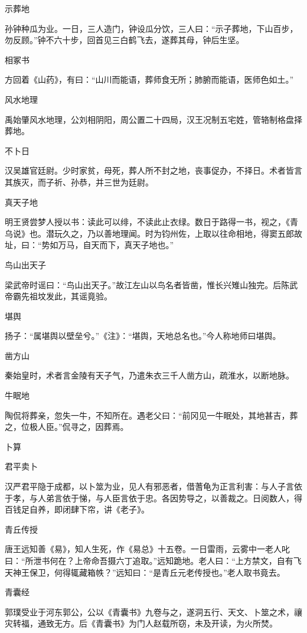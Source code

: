 \documentclass[a4paper,12pt,UTF8,twoside]{ctexbook}
\begin{document}
    示葬地
    
    孙钟种瓜为业。一日，三人造门，钟设瓜分饮，三人曰：“示子葬地，下山百步，勿反顾。”钟不六十步，回首见三白鹤飞去，遂葬其母，钟后生坚。
    
    相冢书
    
    方回着《山药》，有曰：“山川而能语，葬师食无所；肺腑而能语，医师色如土。”
    
    风水地理
    
    禹始肇风水地理，公刘相阴阳，周公置二十四局，汉王况制五宅姓，管辂制格盘择葬地。
    
    不卜日
    
    汉吴雄官廷尉。少时家贫，母死，葬人所不封之地，丧事促办，不择日。术者皆言其族灭，而子祈、孙恭，并三世为廷尉。
    
    真天子地
    
    明王贤尝梦人授以书：读此可以绯，不读此止衣绿。数日于路得一书，视之，《青乌说》也。潜玩久之，乃以善地理闻。时为钧州佐，上取以往命相地，得窦五郎故址，曰：“势如万马，自天而下，真天子地也。”
    
    鸟山出天子
    
    梁武帝时谣曰：“鸟山出天子。”故江左山以鸟名者皆凿，惟长兴雉山独完。后陈武帝霸先祖坟发此，其谣竟验。
    
    堪舆
    
    扬子：“属堪舆以壁垒兮。”《注》：“堪舆，天地总名也。”今人称地师曰堪舆。
    
    凿方山
    
    秦始皇时，术者言金陵有天子气，乃遣朱衣三千人凿方山，疏淮水，以断地脉。
    
    牛眠地
    
    陶侃将葬亲，忽失一牛，不知所在。遇老父曰：“前冈见一牛眠处，其地甚吉，葬之，位极人臣。”侃寻之，因葬焉。
    
    卜算
    
    君平卖卜
    
    汉严君平隐于成都，以卜筮为业，见人有邪恶者，借蓍龟为正言利害：与人子言依于孝，与人弟言依于悌，与人臣言依于忠。各因势导之，以善裁之。日阅数人，得百钱足自养，即闭肆下帘，讲《老子》。
    
    青丘传授
    
    唐王远知善《易》，知人生死，作《易总》十五卷。一日雷雨，云雾中一老人叱曰：“所泄书何在？上帝命吾摄六丁追取。”远知跪地。老人曰：“上方禁文，自有飞天神王保卫，何得辄藏箱帙？”远知曰：“是青丘元老传授也。”老人取书竟去。
    
    青囊经
    
    郭璞受业于河东郭公，公以《青囊书》九卷与之，遂洞五行、天文、卜筮之术，禳灾转福，通致无方。后《青囊书》为门人赵载所窃，未及开读，为火所焚。
    
\end{document}
